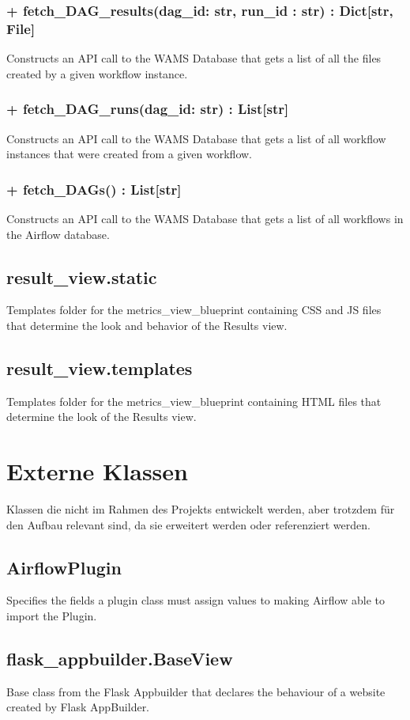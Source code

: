 \subsubsection{+ fetch\_DAG\_results(dag\_id: str, run\_id : str) : Dict[str, File]}
Constructs an API call to the WAMS Database that gets a list of all the files created by a 
given workflow instance.

\subsubsection{+ fetch\_DAG\_runs(dag\_id: str) : List[str]}
Constructs an API call to the WAMS Database that gets a list of all workflow instances that were created from a given workflow.

\subsubsection{+ fetch\_DAGs() : List[str]}
Constructs an API call to the WAMS Database that gets a list of all workflows in the Airflow database.

\subsection{result\_view.static}
Templates folder for the metrics\_view\_blueprint containing CSS and JS files that determine
the look and behavior of the Results view.

\subsection{result\_view.templates}
Templates folder for the metrics\_view\_blueprint containing HTML files that determine the 
look of the Results view.

\section{Externe Klassen} 
Klassen die nicht im Rahmen des Projekts entwickelt werden, aber trotzdem für den Aufbau relevant 
sind, da sie erweitert werden oder referenziert werden.

\subsection{AirflowPlugin}
Specifies the fields a plugin class must assign values to making Airflow able to import the Plugin.

\subsection{flask\_appbuilder.BaseView}
Base class from the Flask Appbuilder that declares the behaviour of a website created by Flask AppBuilder.

